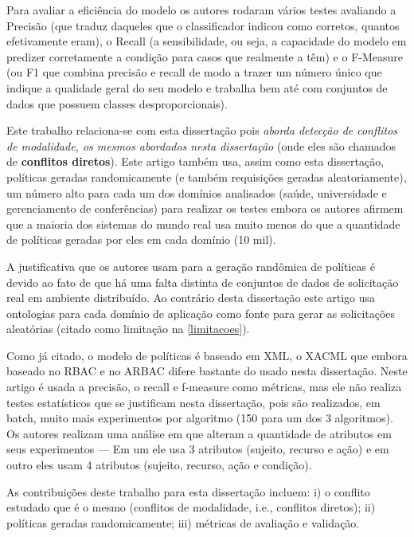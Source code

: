 Para avaliar a eficiência do modelo os autores rodaram vários testes avaliando a Precisão (que traduz daqueles que o classificador indicou como corretos, quantos efetivamente eram), o Recall (a sensibilidade, ou seja, a capacidade do modelo em predizer corretamente a condição para casos que realmente a têm) e o F-Measure (ou F1 que combina precisão e recall de modo a trazer um número único que indique a qualidade geral do seu modelo e trabalha bem até com conjuntos de dados que possuem classes desproporcionais). 

Este trabalho relaciona-se com esta dissertação pois \textit{aborda detecção de conflitos de modalidade, os mesmos abordados nesta dissertação} (onde eles são chamados de\textbf{ conflitos diretos}). Este artigo também usa, assim como esta dissertação, políticas geradas randomicamente (e também requisições geradas aleatoriamente), um número alto para cada um dos domínios analisados (saúde, universidade e gerenciamento de conferências) para realizar os testes embora os autores afirmem que a maioria dos sistemas do mundo real usa muito menos do que a quantidade de políticas geradas por eles em cada domínio (10 mil). 

A justificativa que os autores usam para a geração randômica de políticas é devido ao fato de que há uma falta distinta de conjuntos de dados de solicitação real em ambiente distribuído. Ao contrário desta dissertação este artigo usa ontologias para cada domínio de aplicação como fonte para gerar as solicitações aleatórias (citado como limitação na \autoref{limitacoes}). 

Como já citado, o modelo de políticas é baseado em XML, o XACML que embora baseado no RBAC e no ARBAC difere bastante do usado nesta dissertação. Neste artigo é usada a precisão, o recall e f-measure como métricas, mas ele não realiza testes estatísticos que se justificam nesta dissertação, pois são realizados, em batch, muito mais experimentos por algoritmo (150 para um dos 3 algoritmos). Os autores realizam uma análise em que alteram a quantidade de atributos em seus experimentos --- Em um ele usa 3 atributos (sujeito, recurso e ação) e em outro eles usam 4 atributos (sujeito, recurso, ação e condição). %

As contribuições deste trabalho para esta dissertação incluem: i) o conflito estudado que é o mesmo (conflitos de modalidade, i.e., conflitos diretos); ii) políticas geradas randomicamente; iii) métricas de avaliação e validação. 

